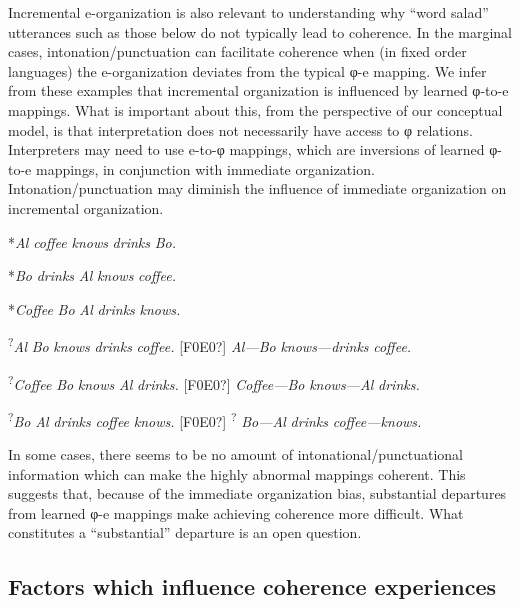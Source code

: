   Incremental e-organization is also relevant to understanding why “word salad” utterances such as those below do not typically lead to coherence. In the marginal cases, intonation/punctuation can facilitate coherence when (in fixed order languages) the e-organization deviates from the typical φ-e mapping. We infer from these examples that incremental organization is influenced by learned φ-to-e mappings. What is important about this, from the perspective of our conceptual model, is that interpretation does not necessarily have access to φ relations. Interpreters may need to use e-to-φ mappings, which are inversions of learned φ-to-e mappings, in conjunction with immediate organization. Intonation/punctuation may diminish the influence of immediate organization on incremental organization. 

    *\textit{Al} \textit{coffee} \textit{knows} \textit{drinks} \textit{Bo.}  

    *\textit{Bo} \textit{drinks} \textit{Al} \textit{knows} \textit{coffee.}

    *\textit{Coffee} \textit{Bo} \textit{Al} \textit{drinks} \textit{knows.}

    \textsuperscript{?}\textit{Al} \textit{Bo} \textit{knows} \textit{drinks} \textit{coffee.}   [F0E0?]   \textit{Al—Bo} \textit{knows—drinks} \textit{coffee.}

    \textsuperscript{?}\textit{Coffee} \textit{Bo} \textit{knows} \textit{Al} \textit{drinks.}   [F0E0?]  \textit{Coffee—Bo} \textit{knows—Al} \textit{drinks.}

    \textsuperscript{?}\textit{Bo} \textit{Al} \textit{drinks} \textit{coffee} \textit{knows.}  [F0E0?]  \textsuperscript{?} \textit{Bo—Al} \textit{drinks} \textit{coffee—knows.}

  In some cases, there seems to be no amount of intonational/punctuational information which can make the highly abnormal mappings coherent. This suggests that, because of the immediate organization bias, substantial departures from learned φ-e mappings make achieving coherence more difficult. What constitutes a “substantial” departure is an open question.

\subsection{Factors which influence coherence experiences}

